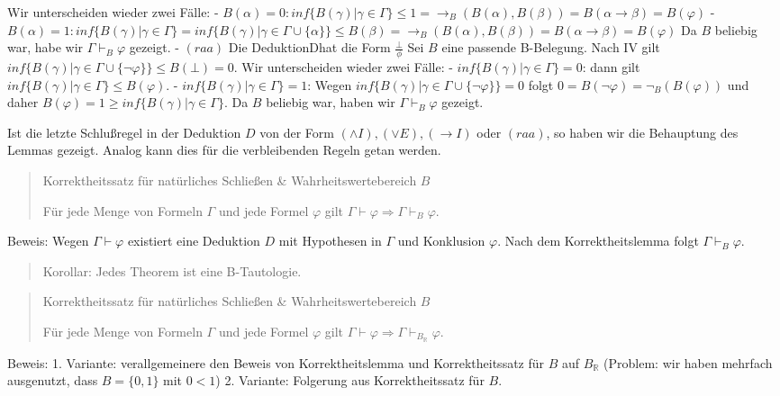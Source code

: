 \documentclass[a4paper]{article}
\begin{document}
\begin{multicols}{3}
  Wir unterscheiden wieder zwei Fälle: -
  $B(\alpha)=0:inf\{B(\gamma)|\gamma\in\Gamma\}\leq 1 =\rightarrow_B(B(\alpha),B(\beta)) = B(\alpha\rightarrow\beta) =B(\varphi)$
  -
  $B(\alpha)=1:inf\{B(\gamma)|\gamma\in\Gamma\}=inf\{B(\gamma)|\gamma\in\Gamma\cup\{\alpha\}\}\leq B(\beta) =\rightarrow_B (B(\alpha),B(\beta)) = B(\alpha\rightarrow\beta) =B(\varphi)$
  Da $B$ beliebig war, habe wir $\Gamma\vdash_B \varphi$ gezeigt. -
  $(raa)$ Die DeduktionDhat die Form $\frac{\bot}{\phi}$ Sei $B$ eine
  passende B-Belegung. Nach IV gilt
  $inf\{B(\gamma)|\gamma\in\Gamma\cup\{\lnot\varphi\}\}\leq B(\bot) = 0$.
  Wir unterscheiden wieder zwei Fälle: -
  $inf\{B(\gamma)|\gamma\in\Gamma\}=0$: dann gilt
  $inf\{B(\gamma)|\gamma\in\Gamma\}\leq B(\varphi)$. -
  $inf\{B(\gamma)|\gamma\in\Gamma\}=1$: Wegen
  $inf\{B(\gamma)|\gamma\in\Gamma\cup\{\lnot\varphi\}\}=0$ folgt
  $0 =B(\lnot\varphi)=\lnot_B (B(\varphi))$ und daher
  $B(\varphi)=1\geq inf\{B(\gamma)|\gamma\in\Gamma\}$. Da $B$ beliebig
  war, haben wir $\Gamma\vdash_B \varphi$ gezeigt.

  Ist die letzte Schlußregel in der Deduktion $D$ von der Form
  $(\wedge I), (\vee E), (\rightarrow I)$ oder $(raa)$, so haben wir die
  Behauptung des Lemmas gezeigt. Analog kann dies für die verbleibenden
  Regeln getan werden.

  \begin{quote}
    Korrektheitssatz für natürliches Schließen \& Wahrheitswertebereich $B$

    Für jede Menge von Formeln $\Gamma$ und jede Formel $\varphi$ gilt
    $\Gamma\vdash\varphi\Rightarrow\Gamma\vdash_B\varphi$.
  \end{quote}

  Beweis: Wegen $\Gamma\vdash\varphi$ existiert eine Deduktion $D$ mit
  Hypothesen in $\Gamma$ und Konklusion $\varphi$. Nach dem
  Korrektheitslemma folgt $\Gamma\vdash_B \varphi$.

  \begin{quote}
    Korollar: Jedes Theorem ist eine B-Tautologie.
  \end{quote}

  \begin{quote}
    Korrektheitssatz für natürliches Schließen \& Wahrheitswertebereich $B$

    Für jede Menge von Formeln $\Gamma$ und jede Formel $\varphi$ gilt
    $\Gamma\vdash\varphi\Rightarrow\Gamma\vdash_{B_\mathbb{R}}\varphi$.
  \end{quote}

  Beweis: 1. Variante: verallgemeinere den Beweis von Korrektheitslemma
  und Korrektheitssatz für $B$ auf $B_\mathbb{R}$ (Problem: wir haben
  mehrfach ausgenutzt, dass $B=\{0,1\}$ mit $0<1$) 2. Variante: Folgerung
  aus Korrektheitssatz für $B$.


\end{multicols}
\end{document}
